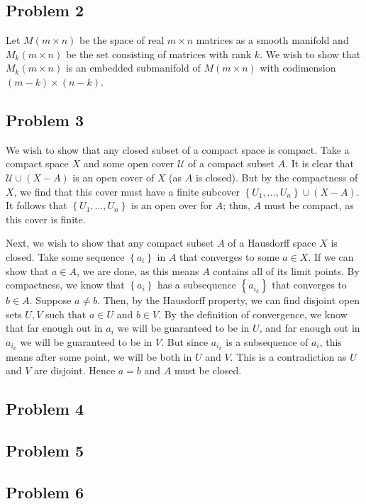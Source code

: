 \documentclass{../../mathnotes}
\begin{document}
\subsection*{Problem 2}

Let $M(m\times n)$ be the space of real $m\times n$ matrices as a smooth manifold and $M_k(m\times n)$ be the set
consisting of matrices with rank $k$. We wish to show that $M_k(m\times n)$ is an embedded submanifold of $M(m\times n)$
with codimension $(m-k)\times (n-k)$.

\subsection*{Problem 3}

We wish to show that any closed subset of a compact space is compact. Take a compact space $X$ and some open cover
$\mathcal{U}$ of a compact subset $A$. It is clear that $\mathcal{U}\cup (X-A)$ is an open cover of $X$ (as
$A$ is closed). But by the compactness of $X$, we find that this cover must have a finite subcover $\left\{U_1,\ldots,U_n\right\}\cup (X-A)$.
It follows that $\left\{ U_1,\ldots,U_n \right\}$ is an open over for $A$; thus, $A$ must be compact, as this cover is finite.

Next, we wish to show that any compact subset $A$ of a Hausdorff space $X$ is closed. Take some sequence $\left\{ a_i \right\}$ in $A$ that
converges to some $a\in X$. If we can show that $a\in A$, we are done, as this means $A$ contains all of its limit points. By compactness,
we know that $\left\{ a_i \right\}$ has a subsequence $\left\{ a_{i_k} \right\}$ that converges to $b\in A$. Suppose $a\neq b$. Then, by the
Hausdorff property, we can find disjoint open sets $U,V$ such that $a\in U$ and $b\in V$. By the definition of convergence, we know that
far enough out in $a_i$ we will be guaranteed to be in $U$, and far enough out in $a_{i_k}$ we will be guaranteed to be in $V$. But
since $a_{i_k}$ is a subsequence of $a_i$, this means after some point, we will be both in $U$ and $V$. This is a contradiction as $U$ and $V$
are disjoint. Hence $a=b$ and $A$ must be closed.


\subsection*{Problem 4}


\subsection*{Problem 5}


\subsection*{Problem 6}
\end{document}
